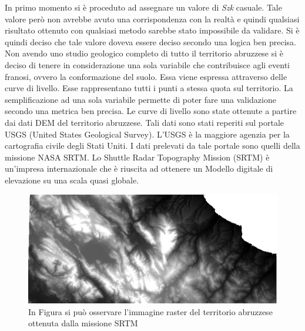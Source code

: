 In primo momento si è proceduto ad assegnare un valore di \textit{Szk} casuale.
Tale valore però non avrebbe avuto una corrispondenza con la realtà e quindi qualsiasi risultato ottenuto con qualsiasi metodo sarebbe stato impossibile da validare. Si è quindi deciso che tale valore doveva essere deciso secondo una logica ben precisa.
Non avendo uno studio geologico completo di tutto il territorio abruzzese si è deciso di tenere in considerazione una sola variabile che contribuisce agli eventi franosi, ovvero la conformazione del suolo. Essa viene espressa attraverso delle curve di livello. Esse rappresentano tutti i punti a stessa quota sul territorio. La semplificazione ad una sola variabile permette di poter fare una validazione secondo una metrica ben precisa.
Le curve di livello  sono state ottenute a partire dai dati DEM del territorio abruzzese.
Tali dati sono stati reperiti sul portale USGS (United States Geological Survey). L'USGS è la maggiore agenzia per la cartografia civile degli Stati Uniti. I dati prelevati da tale portale sono quelli della missione NASA SRTM.
Lo Shuttle Radar Topography Mission (SRTM) è un'impresa internazionale che è riuscita ad ottenere un Modello digitale di elevazione su una scala quasi globale. 
\begin{figure}[h]
	\centering
	\includegraphics[width=1\textwidth]{images/STRM.PNG}
	\caption{In Figura si può osservare l'immagine raster del territorio abruzzese ottenuta dalla missione SRTM}
	\label{fig:diagrammaER}
\end{figure}

